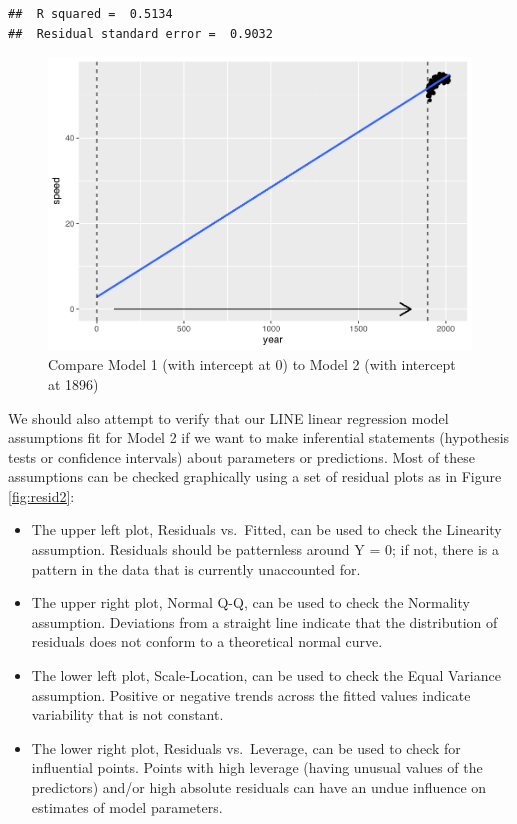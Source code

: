\documentclass[
]{krantz}
\providecommand{\tightlist}{%
  \setlength{\itemsep}{0pt}\setlength{\parskip}{0pt}}
\begin{document}
\begin{verbatim}
##  R squared =  0.5134 
##  Residual standard error =  0.9032
\end{verbatim}

\begin{figure}

{\centering \includegraphics[width=0.9\linewidth]{bookdown-BeyondMLR_files/figure-latex/center-1} 

}

\caption{Compare Model 1 (with intercept at 0) to Model 2 (with intercept at 1896)}\label{fig:center}
\end{figure}

We should also attempt to verify that our LINE linear regression model assumptions fit for Model 2 if we want to make inferential statements (hypothesis tests or confidence intervals) about parameters or predictions. Most of these assumptions can be checked graphically using a set of residual plots as in Figure \ref{fig:resid2}:

\begin{itemize}
\tightlist
\item
  The upper left plot, Residuals vs.~Fitted, can be used to check the Linearity assumption. Residuals should be patternless around Y = 0; if not, there is a pattern in the data that is currently unaccounted for.
\item
  The upper right plot, Normal Q-Q, can be used to check the Normality assumption. Deviations from a straight line indicate that the distribution of residuals does not conform to a theoretical normal curve.
\item
  The lower left plot, Scale-Location, can be used to check the Equal Variance assumption. Positive or negative trends across the fitted values indicate variability that is not constant.
\item
  The lower right plot, Residuals vs.~Leverage, can be used to check for influential points. Points with high leverage (having unusual values of the predictors) and/or high absolute residuals can have an undue influence on estimates of model parameters.
\end{itemize}
\end{document}
